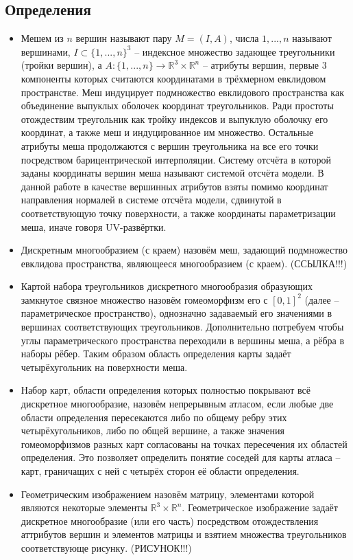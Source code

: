 \documentclass{article}
\begin{document}
\subsection{Определения}
\begin{itemize}
\item Мешем из $n$ вершин называют пару $M = (I, A)$, числа $1,...,n$ называют вершинами, $I \subset \{1, ..., n\}^3$ -- индексное множество задающее треугольники (тройки вершин), а $A: \{1, ..., n\} \rightarrow \mathbb{R}^3 \times \mathbb{R}^n$ -- атрибуты вершин, первые 3 компоненты которых считаются координатами в трёхмерном евклидовом пространстве. Меш индуцирует подмножество евклидового пространства как объединение выпуклых оболочек координат треугольников. Ради простоты отождествим треугольник как тройку индексов и выпуклую оболочку его координат, а также меш и индуцированное им множество. Остальные атрибуты меша продолжаются с вершин треугольника на все его точки посредством барицентрической интерполяции. Систему отсчёта в которой заданы координаты вершин меша называют системой отсчёта модели. В данной работе в качестве вершинных атрибутов взяты помимо координат направления нормалей в системе отсчёта модели, сдвинутой в соответствующую точку поверхности, а также координаты параметризации меша, иначе говоря UV-развёртки.
\item Дискретным многообразием (с краем) назовём меш, задающий подмножество евклидова пространства, являющееся многообразием (с краем). (ССЫЛКА!!!)
\item Картой набора треугольников дискретного многообразия образующих замкнутое связное множество назовём гомеоморфизм его с $[0,1]^2$ (далее -- параметрическое пространство), однозначно задаваемый его значениями в вершинах соответствующих треугольников. Дополнительно потребуем чтобы углы параметрического пространства переходили в вершины меша, а рёбра в наборы рёбер. Таким образом область определения карты задаёт четырёхугольник на поверхности меша.
\item Набор карт, области определения которых полностью покрывают всё дискретное многообразие, назовём непрерывным атласом, если любые две области определения пересекаются либо по общему ребру этих четырёхугольников, либо по общей вершине, а также значения гомеоморфизмов разных карт согласованы на точках пересечения их областей определения. Это позволяет определить понятие соседей для карты атласа -- карт, граничащих с ней с четырёх сторон её области определения.
\item Геометрическим изображением назовём матрицу, элементами которой являются некоторые элементы $\mathbb{R}^3\times \mathbb{R}^n$. Геометрическое изображение задаёт дискретное многообразие (или его часть) посредством отождествления аттрибутов вершин и элементов матрицы и взятием множества треугольников соответствующе рисунку. (РИСУНОК!!!)
\end{itemize}
\end{document}
